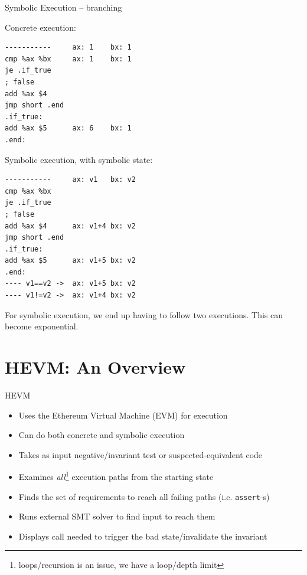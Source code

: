 \documentclass[aspectratio=169]{beamer}
\begin{document}
\begin{frame}[fragile=singleslide]{Symbolic Execution -- branching}
\begin{minipage}[t]{0.45\textwidth}
Concrete execution:
\begin{Verbatim}[fontsize=\small]
-----------     ax: 1    bx: 1
cmp %ax %bx     ax: 1    bx: 1
je .if_true     
; false
add %ax $4
jmp short .end
.if_true:
add %ax $5      ax: 6    bx: 1
.end:
\end{Verbatim}
\end{minipage}%
\begin{minipage}[t]{0.45\textwidth}
Symbolic execution, with symbolic state:
\begin{Verbatim}[fontsize=\small]
-----------     ax: v1   bx: v2
cmp %ax %bx     
je .if_true     
; false
add %ax $4      ax: v1+4 bx: v2
jmp short .end
.if_true:
add %ax $5      ax: v1+5 bx: v2
.end:
---- v1==v2 ->  ax: v1+5 bx: v2
---- v1!=v2 ->  ax: v1+4 bx: v2
\end{Verbatim}
\end{minipage}
\bigskip

For symbolic execution, we end up having to follow two executions. This can become exponential.

\end{frame}

\section{HEVM: An Overview}
\begin{frame}{HEVM}
\begin{itemize}
\item Uses the Ethereum Virtual Machine (EVM) for execution
\item Can do both concrete and symbolic execution
\item Takes as input negative/invariant test or suspected-equivalent code
\item Examines \emph{all}\footnote{loops/recursion is an issue, we have a loop/depth limit} execution paths from the starting state
\item Finds the set of requirements to reach all failing paths (i.e. \texttt{assert}-s)
\item Runs external SMT solver to find input to reach them
\item Displays call needed to trigger the bad state/invalidate the invariant
\end{itemize}
\end{frame}
\end{document}
